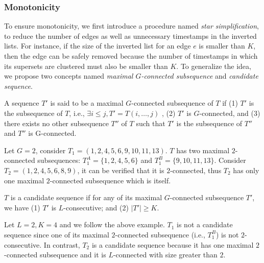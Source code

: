 \subsubsection{Monotonicity}
To ensure monotonicity, we first introduce a procedure named \textit{star simplification}, to reduce the number of edges as well as unnecessary timestamps in the inverted lists. For instance, if the size of the inverted list for an edge $e$ is smaller than $K$, then the edge can be safely removed because the number of timestamps in which its supersets are clustered must also be smaller than $K$. To generalize the idea, we propose two concepts named \textit{maximal $G$-connected subsequence} and \emph{candidate sequence}.

\begin{definition}
A sequence $T'$ is said to be a maximal $G$-connected subsequence of $T$ if (1) $T'$ is the subsequence of $T$, i.e., $\exists i\leq j, T' = T(i,\ldots,j)$ , (2) $T'$ is $G$-connected, and (3) there exists no other subsequence $T''$ of $T$ such that $T'$ is the subsequence of $T''$ and $T''$ is G-connected.
\end{definition}

\begin{example}
Let $G=2$, consider $T_1=(1,2,4,5,6,9,10,11,13)$. $T$ has two maximal $2$-connected subsequences:
$T_1^A=\{1,2,4,5,6\}$ and $T_1^B=\{9,10,11,13\}$. Consider $T_2=(1,2,4,5,6,8,9)$,
it can be verified that it is $2$-connected, thus $T_2$ has only one maximal $2$-connected subsequence which is
itself.
\end{example}


\begin{definition}
$T$ is a candidate sequence if for any of its maximal $G$-connected subsequence $T'$, we have (1) $T'$ is $L$-consecutive; and (2) $|T'|\geq K$.
\end{definition}

\begin{example}
Let $L = 2, K = 4$ and we follow the above example. $T_1$ is not a candidate sequence
since one of its maximal $2$-connected subsequence (i.e., $T_1^B$) is not $2$-consecutive.
In contrast, $T_2$ is a candidate sequence because it has one maximal $2$-connected subsequence
and it is $L$-connected with size greater than $2$.
\end{example}

